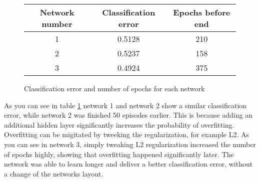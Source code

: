 \documentclass[12pt,A4]{article}
\begin{document}
\parindent=0cm

\begin{figure}

\begin{center}
\begin{tabular}{|| c c c ||}
\hline
Network number & Classification error & Epochs before end\\[0.5ex]
\hline \hline
1 & 0.5128 & 210\\
\hline
2 & 0.5237 & 158\\
\hline
3 & 0.4924 & 375\\ [1ex]
\hline

\end{tabular}
\end{center}
\caption{Classification error and number of epochs for each network\label{tab}}
\end{figure}
As you can see in table \ref{tab} network 1 and network 2 show a similar classification error, while network 2 was finished 50 episodes earlier. This is because adding an additional hidden layer significantly increases the probability of overfitting.
Overfitting can be migitated by tweeking the regularization, for example L2. As you can see in network 3, simply tweaking L2 regularization increased the number of epochs highly, showing that overfitting happened significantly later. The network was able to learn longer and deliver a better classification error, without a change of the networks layout.
\end{document}
